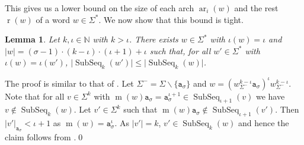 \documentclass[10pt,a4paper]{amsart}
\makeatletter
\newcommand{\N}{\mathbb{N}}
\def\ta{\mathtt{a}}
\def\r{\operatorname{r}}
\def\m{\operatorname{m}}
\DeclareMathOperator{\arch}{ar}
\DeclareMathOperator\ScatFact{SubSeq}
\DeclareMathOperator{\Univ}{Univ}
\newif\ifpaper
\theoremstyle{plain}
\newtheorem{lemma}{Lemma}
\theoremstyle{definition}
\renewenvironment{proof}[1][\proofname]{\par
  \pushQED{}%
  \normalfont \topsep6\p@\@plus6\p@\relax
  \trivlist
  \item[\hskip\labelsep\itshape #1\@addpunct{.}]\ignorespaces
}{%
  \popQED\endtrivlist\@endpefalse
}
\makeatother
\begin{document}
\ifpaper
\else
This gives us a lower bound on the size of each arch $\arch_i(w)$ and the rest $\r(w)$ of a word $w\in\Sigma^*$. We now show that this bound is tight.
\fi


\ifpaper
\else
\begin{lemma}\label{lemma:min-absent-shortest-upper-bound}
    Let $k, \iota\in \N$ with $k > \iota$. There exists $w\in\Sigma^*$ with $\iota(w)=\iota$ and $\vert w \vert = (\sigma-1)\cdot(k-\iota)\cdot(\iota+1)+\iota$ such that, for all 
    $w'\in\Sigma^*$ with $\iota(w)  = \iota(w')$, $\vert\ScatFact_k(w')\vert \leq \vert\ScatFact_k(w)\vert$.
\end{lemma}

\begin{proof}
	The proof is similar to that of .
	Let $\Sigma^-=\Sigma\backslash\{\ta_{\sigma}\}$ and $w = (w_{\Sigma^-}^{k-\iota} \ta_\sigma)^{\iota}w_{\Sigma^-}^{k-\iota}$.
	Note that for all $v\in\Sigma^k$ with $\m(w)\ta_\sigma = \ta_{\sigma}^{\iota+1} \in \ScatFact_{\iota+1}(v)$ we have $v \notin \ScatFact_k(w)$. Let $v'\in\Sigma^k$ such that  $\m(w)\ta_\sigma \notin \ScatFact_{\iota+1}(v')$. Then $\vert v'\vert_{\ta_\sigma} < \iota + 1$ as $\m(w) = \ta_{\sigma}^{\iota}$.
	As $\vert v' \vert = k$, $v'\in\ScatFact_k(w)$ and hence the claim follows from .\qed
\end{proof}
\fi


\end{document}
